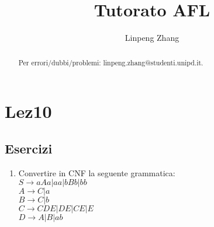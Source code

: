 \documentclass[a4paper,11pt]{article}
\begin{document}
\author{Linpeng Zhang}
\title{Tutorato AFL}
\maketitle
\begin{abstract}
    Per errori/dubbi/problemi: linpeng.zhang@studenti.unipd.it.
\end{abstract}
\tableofcontents
\section{Lez10}
\subsection{Esercizi}
\begin{enumerate}
    \item Convertire in CNF la seguente grammatica:\\
    $S\rightarrow aAa|aa|bBb|bb$\\
    $A\rightarrow C|a$\\
    $B\rightarrow C|b$\\
    $C\rightarrow CDE|DE|CE|E$\\
    $D\rightarrow A|B|ab$\\
\end{enumerate}
\end{document}
